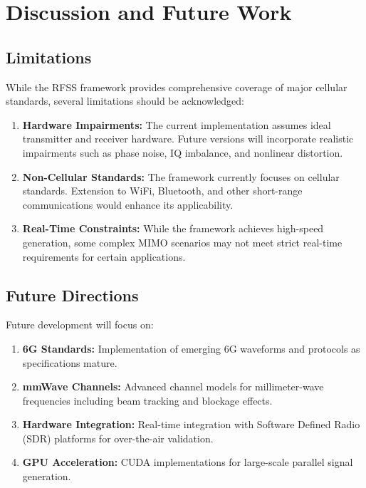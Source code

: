 \documentclass[twocolumn,10pt]{article}
\begin{document}
\section{Discussion and Future Work}

\subsection{Limitations}

While the RFSS framework provides comprehensive coverage of major cellular standards, several limitations should be acknowledged:

\begin{enumerate}
\item \textbf{Hardware Impairments:} The current implementation assumes ideal transmitter and receiver hardware. Future versions will incorporate realistic impairments such as phase noise, IQ imbalance, and nonlinear distortion.

\item \textbf{Non-Cellular Standards:} The framework currently focuses on cellular standards. Extension to WiFi, Bluetooth, and other short-range communications would enhance its applicability.

\item \textbf{Real-Time Constraints:} While the framework achieves high-speed generation, some complex MIMO scenarios may not meet strict real-time requirements for certain applications.
\end{enumerate}

\subsection{Future Directions}

Future development will focus on:

\begin{enumerate}
\item \textbf{6G Standards:} Implementation of emerging 6G waveforms and protocols as specifications mature.

\item \textbf{mmWave Channels:} Advanced channel models for millimeter-wave frequencies including beam tracking and blockage effects.

\item \textbf{Hardware Integration:} Real-time integration with Software Defined Radio (SDR) platforms for over-the-air validation.

\item \textbf{GPU Acceleration:} CUDA implementations for large-scale parallel signal generation.
\end{enumerate}
\end{document}
